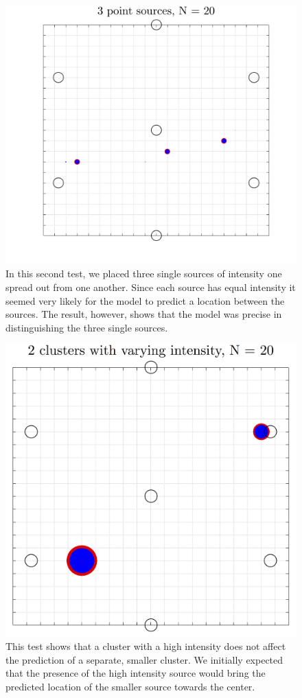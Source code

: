 \documentclass[a4paper]{article}
\begin{document}
\begin{figure}[H]
\centering
\includegraphics[width=.7\textwidth]{3_point_sources_copy.pdf}
\caption{In this second test, we placed three single sources of intensity one spread out from one another. Since each source has equal intensity it seemed very likely for the model to predict a location between the sources. The result, however, shows that the model was precise in distinguishing the three single sources.}
\label{Figure 5}
\end{figure}

\begin{figure}[H]
\centering
\includegraphics[width=.7\textwidth]{different_clusters_copy.png}
\caption{This test shows that a cluster with a high intensity does not affect the prediction of a separate, smaller cluster. We initially expected that the presence of the high intensity source would bring the predicted location of the smaller source towards the center.}
\label{Figure 6}
\end{figure}
\end{document}
